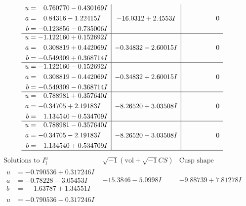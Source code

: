 \documentclass[1p]{elsarticle_modified}
\theoremstyle{definition}
\newcommand{\I}{\sqrt{-1}}
\begin{document}
$$\begin{array}{c|c|c}
\begin{aligned}
u &= \phantom{-}0.760770 - 0.430169 I \\
a &= \phantom{-}0.84316 - 1.22415 I \\
b &= -0.123856 - 0.735006 I\end{aligned}
 & -16.0312 + 2.4553 I & \phantom{-0.000000 } 0 \\ \hline\begin{aligned}
u &= -1.122160 + 0.152692 I \\
a &= \phantom{-}0.308819 + 0.442069 I \\
b &= -0.549309 + 0.368714 I\end{aligned}
 & -0.34832 - 2.60015 I & \phantom{-0.000000 } 0 \\ \hline\begin{aligned}
u &= -1.122160 - 0.152692 I \\
a &= \phantom{-}0.308819 - 0.442069 I \\
b &= -0.549309 - 0.368714 I\end{aligned}
 & -0.34832 + 2.60015 I & \phantom{-0.000000 } 0 \\ \hline\begin{aligned}
u &= \phantom{-}0.788981 + 0.357640 I \\
a &= -0.34705 + 2.19183 I \\
b &= \phantom{-}1.134540 - 0.534709 I\end{aligned}
 & -8.26520 + 3.03508 I & \phantom{-0.000000 } 0 \\ \hline\begin{aligned}
u &= \phantom{-}0.788981 - 0.357640 I \\
a &= -0.34705 - 2.19183 I \\
b &= \phantom{-}1.134540 + 0.534709 I\end{aligned}
 & -8.26520 - 3.03508 I & \phantom{-0.000000 } 0\\
 \hline 
 \end{array}$$\newpage$$\begin{array}{c|c|c}  
\text{Solutions to }I^u_{1}& \I (\text{vol} + \sqrt{-1}CS) & \text{Cusp shape}\\
 \hline 
\begin{aligned}
u &= -0.790536 + 0.317246 I \\
a &= -0.78228 - 3.05453 I \\
b &= \phantom{-}1.63787 + 1.34551 I\end{aligned}
 & -15.3846 - 5.0998 I & -9.88739 + 7.81278 I \\ \hline\begin{aligned}
u &= -0.790536 - 0.317246 I \\

\end{aligned}
\end{array}$$
\end{document}
